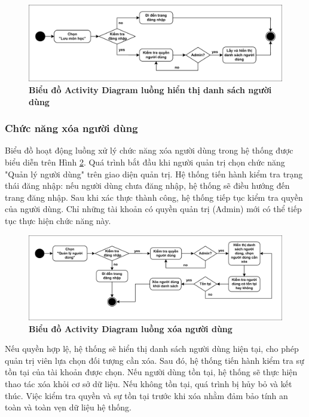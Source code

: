 \documentclass{article}
\begin{document}
	\begin{figure}[!ht]
		\centering
		\includegraphics[trim= 10pt 10pt 10pt 10pt, clip, width=16cm]{activity_fig313.pdf}
		\caption [Biểu đồ Activity Diagram luồng hiển thị danh sách người dùng]{\bfseries \fontsize{12pt}{0pt}\selectfont Biểu đồ Activity Diagram luồng hiển thị danh sách người dùng}
		\label{fig313}
	\end{figure}
	
	\subsubsection{Chức năng xóa người dùng}
	
	Biểu đồ hoạt động luồng xử lý chức năng xóa người dùng trong hệ thống được biểu diễn trên Hình \ref{fig314}. Quá trình bắt đầu khi người quản trị chọn chức năng "Quản lý người dùng" trên giao diện quản trị. Hệ thống tiến hành kiểm tra trạng thái đăng nhập: nếu người dùng chưa đăng nhập, hệ thống sẽ điều hướng đến trang đăng nhập. Sau khi xác thực thành công, hệ thống tiếp tục kiểm tra quyền của người dùng. Chỉ những tài khoản có quyền quản trị (Admin) mới có thể tiếp tục thực hiện chức năng này.
	
	\begin{figure}[!ht]
		\centering
		\includegraphics[trim= 10pt 10pt 10pt 10pt, clip, width=16cm]{activity_fig314.pdf}
		\caption [Biểu đồ Activity Diagram luồng xóa người dùng]{\bfseries \fontsize{12pt}{0pt}\selectfont Biểu đồ Activity Diagram luồng xóa người dùng}
		\label{fig314}
	\end{figure}
	
	Nếu quyền hợp lệ, hệ thống sẽ hiển thị danh sách người dùng hiện tại, cho phép quản trị viên lựa chọn đối tượng cần xóa. Sau đó, hệ thống tiến hành kiểm tra sự tồn tại của tài khoản được chọn. Nếu người dùng tồn tại, hệ thống sẽ thực hiện thao tác xóa khỏi cơ sở dữ liệu. Nếu không tồn tại, quá trình bị hủy bỏ và kết thúc. Việc kiểm tra quyền và sự tồn tại trước khi xóa nhằm đảm bảo tính an toàn và toàn vẹn dữ liệu hệ thống.
	
\end{document}
